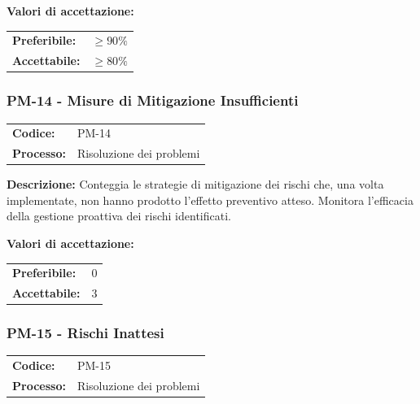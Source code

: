 \documentclass[a4paper,11pt,oneside]{scrartcl}
\begin{document}
\vspace{0.2cm}
\noindent\textbf{Valori di accettazione:}
\vspace{0.1cm}

\noindent
\begin{tabular}{@{}ll@{}}
    \textbf{Preferibile:} & $\ge 90\%$ \\
    \textbf{Accettabile:} & $\ge 80\%$ \\
\end{tabular}

\subsubsection{PM-14 - Misure di Mitigazione Insufficienti}

\noindent
\begin{tabular}{@{}p{}p{}@{}}
    \textbf{Codice:}   & PM-14                    \\
    \textbf{Processo:} & Risoluzione dei problemi \\
\end{tabular}

\vspace{0.3cm}
\noindent\textbf{Descrizione:} Conteggia le strategie di mitigazione{\scriptsize{}} dei rischi che, una volta implementate, non hanno prodotto l'effetto preventivo atteso. Monitora l'efficacia della gestione proattiva dei rischi identificati.

\vspace{0.2cm}
\noindent\textbf{Valori di accettazione:}
\vspace{0.1cm}

\noindent
\begin{tabular}{@{}ll@{}}
    \textbf{Preferibile:} & $0$ \\
    \textbf{Accettabile:} & $3$ \\
\end{tabular}

\subsubsection{PM-15 - Rischi Inattesi}

\noindent
\begin{tabular}{@{}p{}p{}@{}}
    \textbf{Codice:}   & PM-15                    \\
    \textbf{Processo:} & Risoluzione dei problemi \\
\end{tabular}
\end{document}
